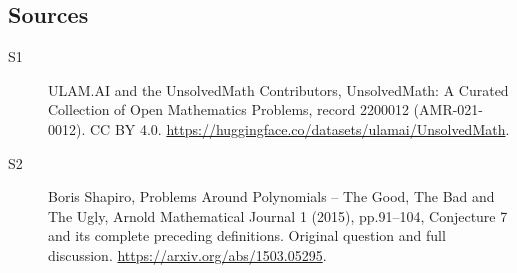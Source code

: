 \documentclass[11pt]{article}
\begin{document}
\subsection{Sources}
\begin{description}
\item[\hypertarget{source:2200012:1}{S1}] ULAM.AI and the UnsolvedMath Contributors, UnsolvedMath: A Curated Collection of Open Mathematics Problems, record 2200012 (AMR-021-0012). CC BY 4.0. \url{https://huggingface.co/datasets/ulamai/UnsolvedMath}.
\item[\hypertarget{source:2200012:2}{S2}] Boris Shapiro, Problems Around Polynomials -- The Good, The Bad and The Ugly, Arnold Mathematical Journal 1 (2015), pp.91--104, Conjecture 7 and its complete preceding definitions. Original question and full discussion. \url{https://arxiv.org/abs/1503.05295}.

\end{description}
\label{end:2200012}
\end{document}
